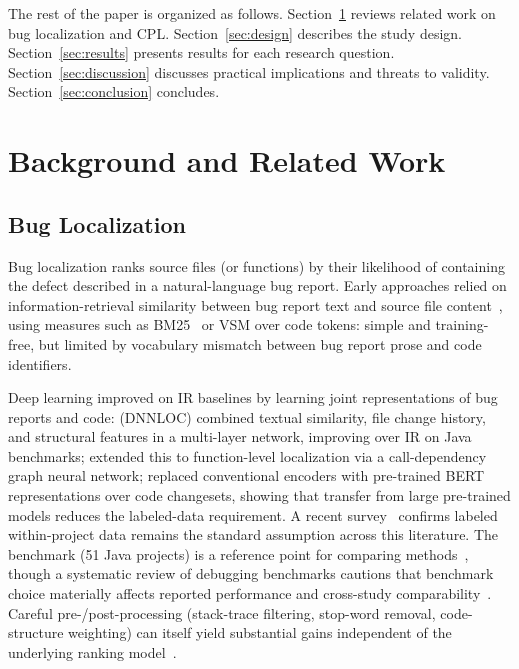 \documentclass[a4paper,fleqn]{cas-dc}
\begin{document}
The rest of the paper is organized as follows. Section~\ref{sec:related} reviews related work on bug localization and CPL. Section~\ref{sec:design} describes the study design. Section~\ref{sec:results} presents results for each research question. Section~\ref{sec:discussion} discusses practical implications and threats to validity. Section~\ref{sec:conclusion} concludes.

\section{Background and Related Work}
\label{sec:related}

\subsection{Bug Localization}

Bug localization ranks source files (or functions) by their likelihood of
containing the defect described in a natural-language bug report. Early
approaches relied on information-retrieval similarity between bug report
text and source file content~\citep{zhou2012should,saha2013improving,ye2014learning},
using measures such as BM25~\citep{robertson2009probabilistic} or VSM over
code tokens: simple and training-free, but limited by vocabulary
mismatch between bug report prose and code identifiers.

Deep learning improved on IR baselines by learning joint representations
of bug reports and code: \citet{lam2017bug} (DNNLOC) combined textual
similarity, file change history, and structural features in a multi-layer
network, improving over IR on Java benchmarks; \citet{liang2022modeling}
extended this to function-level localization via a call-dependency graph
neural network; \citet{ciborowska2022fast} replaced conventional encoders
with pre-trained BERT~\citep{devlin2019bert} representations over code
changesets, showing that transfer from large pre-trained models reduces
the labeled-data requirement. A recent survey~\citep{niu2025deep} confirms
labeled within-project data remains the standard assumption across this
literature. The \citet{lee2018bench4bl} benchmark (51 Java projects) is a
reference point for comparing methods~\citep{bogomolov2024long}, though a
systematic review of debugging benchmarks cautions that benchmark choice
materially affects reported performance and cross-study
comparability~\citep{hirsch2022benchmarks}. Careful pre-/post-processing
(stack-trace filtering, stop-word removal, code-structure weighting) can
itself yield substantial gains independent of the underlying ranking
model~\citep{kim2022digbug}.
\end{document}
